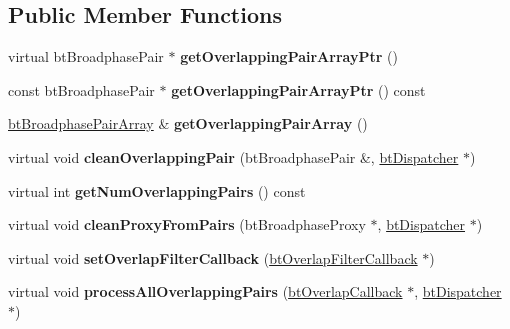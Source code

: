 \subsection*{Public Member Functions}
\begin{DoxyCompactItemize}
\item 
\mbox{\label{classbtNullPairCache_a4ec1efad728fc0578fb780d1b99a4fe3}} 
virtual bt\+Broadphase\+Pair $\ast$ {\bfseries get\+Overlapping\+Pair\+Array\+Ptr} ()
\item 
\mbox{\label{classbtNullPairCache_a4172f88610db99f01fa406575bf2bb30}} 
const bt\+Broadphase\+Pair $\ast$ {\bfseries get\+Overlapping\+Pair\+Array\+Ptr} () const
\item 
\mbox{\label{classbtNullPairCache_ae5be2cc230e27881fd04fe1da320c7fe}} 
\hyperlink{classbtAlignedObjectArray}{bt\+Broadphase\+Pair\+Array} \& {\bfseries get\+Overlapping\+Pair\+Array} ()
\item 
\mbox{\label{classbtNullPairCache_a20b534e589edacd12ddf52124535c2cc}} 
virtual void {\bfseries clean\+Overlapping\+Pair} (bt\+Broadphase\+Pair \&, \hyperlink{classbtDispatcher}{bt\+Dispatcher} $\ast$)
\item 
\mbox{\label{classbtNullPairCache_a76aa3a3bf39a8758310c55ef183ae80d}} 
virtual int {\bfseries get\+Num\+Overlapping\+Pairs} () const
\item 
\mbox{\label{classbtNullPairCache_ae8dd727539fe9ca3d6380557a925cd1f}} 
virtual void {\bfseries clean\+Proxy\+From\+Pairs} (bt\+Broadphase\+Proxy $\ast$, \hyperlink{classbtDispatcher}{bt\+Dispatcher} $\ast$)
\item 
\mbox{\label{classbtNullPairCache_a5c1cb3394936c0fddddb19a3be8241a3}} 
virtual void {\bfseries set\+Overlap\+Filter\+Callback} (\hyperlink{structbtOverlapFilterCallback}{bt\+Overlap\+Filter\+Callback} $\ast$)
\item 
\mbox{\label{classbtNullPairCache_a39c6b95bf7412b8f37dba2efa633ce09}} 
virtual void {\bfseries process\+All\+Overlapping\+Pairs} (\hyperlink{structbtOverlapCallback}{bt\+Overlap\+Callback} $\ast$, \hyperlink{classbtDispatcher}{bt\+Dispatcher} $\ast$)

\end{DoxyCompactItemize}
